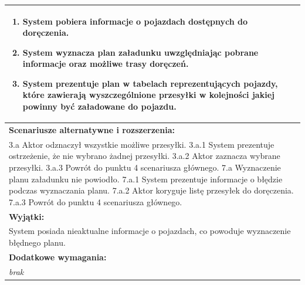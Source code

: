 \begin{center}
\begin{longtable}[h]{|p{1.6cm}|p{13.5cm}|}
{\begin{enumerate}
\item System pobiera informacje o pojazdach dostępnych do doręczenia.
\item System wyznacza plan załadunku uwzględniając pobrane informacje oraz możliwe trasy doręczeń.
\item System prezentuje plan w tabelach reprezentujących pojazdy, które zawierają wyszczególnione przesyłki w kolejności jakiej powinny być załadowane do pojazdu.
\end{enumerate}
} \\ \hline
\multicolumn{2}{|p{15.1cm}|}{\textbf{Scenariusze alternatywne i rozszerzenia:}} \\
\multicolumn{2}{|p{15.1cm}|}{
3.a Aktor odznaczył wszystkie możliwe przesyłki. \newline
3.a.1 System prezentuje ostrzeżenie, że nie wybrano żadnej przesyłki. \newline
3.a.2 Aktor zaznacza wybrane przesyłki. \newline
3.a.3 Powrót do punktu 4 scenariusza głównego. \newline
\newline
7.a Wyznaczenie planu załadunku nie powiodło. \newline
7.a.1 System prezentuje informacje o błędzie podczas wyznaczania planu. \newline
7.a.2 Aktor koryguje listę przesyłek do doręczenia. \newline
7.a.3 Powrót do punktu 4 scenariusza głównego.
} \\ \hline
\multicolumn{2}{|p{15.1cm}|}{\textbf{Wyjątki:}} \\
\multicolumn{2}{|p{15.1cm}|}{
System posiada nieaktualne informacje o pojazdach, co powoduje wyznaczenie błędnego planu.
} \\ \hline
\multicolumn{2}{|p{15.1cm}|}{\textbf{Dodatkowe wymagania:}} \\
\multicolumn{2}{|p{15.1cm}|}{
\textit{brak}
} \\
\hline
\end{longtable}
\end{center}

